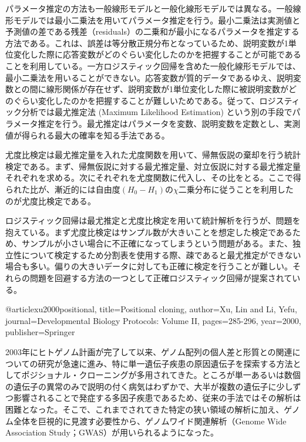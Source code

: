 パラメータ推定の方法も一般線形モデルと一般化線形モデルでは異なる。一般線形モデルでは最小二乗法を用いてパラメータ推定を行う。最小二乗法は実測値と予測値の差である残差（residuals）の二乗和が最小になるパラメータを推定する方法である。これは、誤差は等分散正規分布となっているため、説明変数が1単位変化した際に応答変数がどのぐらい変化したのかを把握することが可能であることを利用している。一方ロジスティック回帰を含めた一般化線形モデルでは、最小二乗法を用いることができない。応答変数が質的データであるゆえ、説明変数との間に線形関係が存在せず、説明変数が1単位変化した際に被説明変数がどのぐらい変化したのかを把握することが難しいためである。従って、ロジスティック分析では最尤推定法 (Maximum Likelihood Estimation) という別の手段でパラメータ推定を行う。最尤推定はパラメータを変数、説明変数を定数とし、実測値が得られる最大の確率を知る手法である。

尤度比検定は最尤推定量を入れた尤度関数を用いて、帰無仮説の棄却を行う統計検定である。まず、帰無仮説に対する最尤推定量、対立仮説に対する最尤推定量それぞれを求める。次にそれぞれを尤度関数に代入し、その比をとる。ここで得られた比が、漸近的には自由度$(H_0 - H_1)$の$χ$二乗分布に従うことを利用したのが尤度比検定である\cite{kubo}。

ロジスティック回帰は最尤推定と尤度比検定を用いて統計解析を行うが、問題を抱えている。まず尤度比検定はサンプル数が大きいことを想定した検定であるため、サンプルが小さい場合に不正確になってしまうという問題がある。また、独立性について検定するため分割表を使用する際、疎であると最尤推定ができない場合も多い。偏りの大きいデータに対しても正確に検定を行うことが難しい\cite{10.2307/2288420, 10.2307/2289388, mehta1998exact, mehta1995exact,10.1198/00031300283}。それらの問題を回避する方法の一つとして正確ロジスティック回帰が提案されている。






@article{xu2000positional,
	title={Positional cloning},
	author={Xu, Lin and Li, Yefu},
	journal={Developmental Biology Protocols: Volume II},
	pages={285-296},
	year={2000},
	publisher={Springer}
}

2003年にヒトゲノム計画が完了して以来、ゲノム配列の個人差と形質との関連についての研究が急速に進み、特に単一遺伝子疾患の原因遺伝子を探索する方法としてポジショナル・クローニングが多用されてきた。ところが単一あるいは数個の遺伝子の異常のみで説明の付く病気はわずかで、大半が複数の遺伝子に少しずつ影響されることで発症する多因子疾患であるため、従来の手法ではその解析は困難となった。そこで、これまでされてきた特定の狭い領域の解析に加え、ゲノム全体を巨視的に見渡す必要性から、ゲノムワイド関連解析（Genome Wide Association Study；GWAS）が用いられるようになった。

